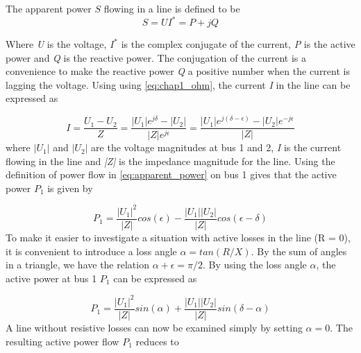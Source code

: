 \documentclass{report}
\begin{document}
The apparent power $S$ flowing in a line is defined to be
\begin{equation}\label{eq:apparent_power}
    S  = UI^{*} = P + jQ
\end{equation}

Where \textit{U} is the voltage, $I^{*}$ is the complex conjugate of the current, \textit{P} is the active power and \textit{Q} is the reactive power. The conjugation of the current is a convenience to make the reactive power \textit{Q} a positive number when the current is lagging the voltage. Using using \eqref{eq:chap1_ohm}, the current \textit{I} in the line can be expressed as

\begin{equation}\label{eq:two_port_current}
    I  = \frac{U_{1} - U_{2}}{Z}
    = \frac{|U_{1}|e^{j\delta} - |U_{2}|}{|Z|e^{j\epsilon}}
    = \frac{|U_{1}|e^{j(\delta- \epsilon)} - |U_{2}|e^{-j\epsilon}}{|Z|}
\end{equation}
where $|U_{1}|$ and $|U_{2}|$ are the voltage magnitudes at bus 1 and 2, \textit{I} is the current flowing in the line and \textit{|Z|} is the impedance magnitude for the line. Using the definition of power flow in \eqref{eq:apparent_power} on bus 1 gives that the active power $P_{1}$ is given by

\begin{equation}\label{eq:two_port_active_power}
P_{1} = \frac{|U_{1}|^2}{|Z|}cos(\epsilon) - \frac{|U_{1}||U_{2}|}{|Z|}cos(\epsilon - \delta)
\end{equation}
To make it easier to investigate a situation with active losses in the line (R = 0), it is convenient to introduce a loss angle $\alpha = tan(R/X)$. By the sum of angles in a triangle, we have the relation $\alpha + \epsilon = \pi/2$. By using the loss angle $\alpha$, the active power at bus 1 $P_{1}$ can be expressed as

\begin{equation}\label{eq:two_port_active_power_good}
P_{1} = \frac{|U_{1}|^2}{|Z|}sin(\alpha) + \frac{|U_{1}||U_{2}|}{|Z|}sin(\delta -\alpha)
\end{equation}
A line without resistive losses can now be examined simply by setting $\alpha = 0$. The resulting active power flow $P_{1}$ reduces to
\end{document}
